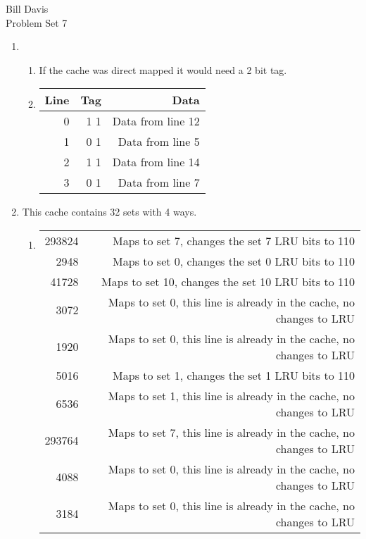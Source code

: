 \documentclass[11pt,fleqn]{article}
\begin{document}
\newcommand{\mbf}[1]{\mbox{{\bfseries #1}}}
\newcommand{\N}{\mbf{N}}
\renewcommand{\O}{\mbf{O}}

\noindent Bill Davis \\
 Problem Set 7
\begin{enumerate}
\item %
  \begin{enumerate}
  \item If the cache was direct mapped it would need a 2 bit tag. 
  \item   \begin{tabular}{|r|r|r|}
  \hline
	Line & Tag & Data \\
  \hline
   0 & 1 1 & Data from line 12 \\
   1 & 0 1 & Data from line 5 \\
   2 & 1 1 & Data from line 14 \\
   3 & 0 1 & Data from line 7 \\
  \hline
  \end{tabular}
  \end{enumerate}
\item %
This cache contains 32 sets with 4 ways. \\
\begin{enumerate}
\item 
\begin{tabular}{r|r}
\hline
293824& Maps to set 7, changes the set 7 LRU bits to 110 \\
2948  & Maps to set 0, changes the set 0 LRU bits to 110 \\
41728 & Maps to set 10, changes the set 10 LRU bits to 110 \\
3072  & Maps to set 0, this line is already in the cache, no changes to LRU \\
1920  & Maps to set 0, this line is already in the cache, no changes to LRU \\
5016  & Maps to set 1, changes the set 1 LRU bits to 110 \\
6536  & Maps to set 1, this line is already in the cache, no changes to LRU \\
293764& Maps to set 7, this line is already in the cache, no changes to LRU \\
4088  & Maps to set 0, this line is already in the cache, no changes to LRU \\
3184  & Maps to set 0, this line is already in the cache, no changes to LRU \\
\hline
\end{tabular}

\end{enumerate}
\end{enumerate}
\end{document}

